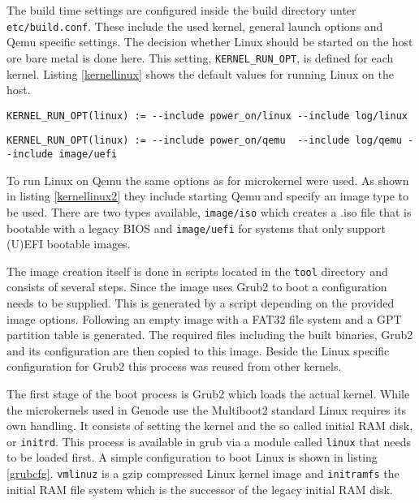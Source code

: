 \documentclass[
a4paper,
12pt,
notitlepage,
parskip=half,
DIV=11,
]{scrbook}
\begin{document}
		The build time settings are configured inside the build directory unter \texttt{etc/build.conf}.
		These include the used kernel, general launch options and Qemu specific settings.
		The decision whether Linux should be started on the host ore bare metal is done here.
		This setting, \texttt{KERNEL\_RUN\_OPT}, is defined for each kernel.
		Listing \ref{kernellinux} shows the default values for running Linux on the host.
		
		\begin{lstlisting}[basicstyle=\ttfamily\footnotesize]
KERNEL_RUN_OPT(linux) := --include power_on/linux --include log/linux
		\end{lstlisting}
		
		\begin{lstlisting}[basicstyle=\ttfamily\footnotesize]
KERNEL_RUN_OPT(linux) := --include power_on/qemu  --include log/qemu --include image/uefi
		\end{lstlisting}
		
		To run Linux on Qemu the same options as for microkernel were used.
		As shown in listing \ref{kernellinux2} they include starting Qemu and specify an image type to be used.
		There are two types available, \texttt{image/iso} which creates a .iso file that is bootable with a legacy BIOS and \texttt{image/uefi} for systems that only support (U)EFI bootable images.
		
		The image creation itself is done in scripts located in the \texttt{tool} directory and consists of several steps.
		Since the image uses Grub2 to boot a configuration needs to be supplied.
		This is generated by a script depending on the provided image options.
		Following an empty image with a FAT32 file system and a GPT partition table is generated.
		The required files including the built binaries, Grub2 and its configuration are then copied to this image.
		Beside the Linux specific configuration for Grub2 this process was reused from other kernels.
		
		
		The first stage of the boot process is Grub2 which loads the actual kernel.
		While the microkernels used in Genode use the Multiboot2 standard Linux requires its own handling.
		It consists of setting the kernel and the so called initial RAM disk, or \texttt{initrd}.
		This process is available in grub via a module called \texttt{linux} that needs to be loaded first.
		A simple configuration to boot Linux is shown in listing \ref{grubcfg}.
		\texttt{vmlinuz} is a gzip compressed Linux kernel image and \texttt{initramfs} the initial RAM file system which is the successor of the legacy initial RAM disk.
		
\end{document}
